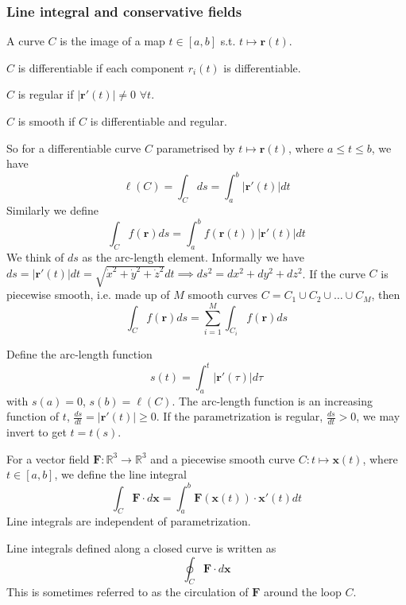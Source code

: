 \documentclass[a4paper]{article}
\begin{document}
\subsubsection*{Line integral and conservative fields}
\begin{defi}[Curve]
A curve $C$ is the image of a map $t\in[a,b]$ s.t. $t\mapsto\mathbf{r}(t)$.
\end{defi}
\begin{defi}
$C$ is differentiable if each component $r_i(t)$ is differentiable.
\end{defi}
\begin{defi}
$C$ is regular if $|\mathbf{r'}(t)|\neq 0$ $\forall t$.
\end{defi}
\begin{defi}
$C$ is smooth if $C$ is differentiable and regular.
\end{defi}
\begin{remarks}
So for a differentiable curve $C$ parametrised by $t\mapsto\mathbf{r}(t)$, where $a\leq t\leq b$, we have
$$\ell(C)=\int_Cds=\int_a^b|\mathbf{r'}(t)|dt$$
Similarly we define
$$\int_Cf(\mathbf{r})ds=\int_a^bf(\mathbf{r}(t))|\mathbf{r'}(t)|dt$$
We think of $ds$ as the arc-length element. Informally we have $ds=|\mathbf{r'}(t)|dt=\sqrt{\dot{x}^2+\dot{y}^2+\dot{z}^2}dt\implies ds^2=dx^2+dy^2+dz^2$. 
If the curve $C$ is piecewise smooth, i.e. made up of $M$ smooth curves $C=C_1\cup C_2\cup\dots\cup C_M$, then
$$\int_Cf(\mathbf{r})ds=\sum_{i=1}^M\int_{C_i}f(\mathbf{r})ds$$
\end{remarks}
\begin{defi}
Define the arc-length function 
$$s(t)=\int_a^t|\mathbf{r'}(\tau)|d\tau$$
with $s(a)=0$, $s(b)=\ell(C)$.  The arc-length function is an
increasing function of $t$,  $\frac{ds}{dt}=|\mathbf{r'}(t)|\geq0$. If the parametrization is regular, $\frac{ds}{dt}>0$, we may invert to get $t=t(s)$.
\end{defi}
\begin{defi}
For a vector field $\mathbf{F}:\mathbb{R}^3\rightarrow\mathbb{R}^3$ and a piecewise smooth curve $C:t\mapsto\mathbf{x}(t)$, where $t\in[a,b]$, we define the line integral
\begin{equation}
    \int_C\mathbf{F}\cdot d\mathbf{x}=\int_a^b\mathbf{F}(\mathbf{x}(t))\cdot\mathbf{x'}(t)dt\tag{1.3}
\end{equation}
Line integrals are independent of parametrization.
\end{defi}
\begin{defi}[Circulation]
Line integrals defined along a closed curve is written as
$$\oint_C\mathbf{F}\cdot d\mathbf{x}$$
This is sometimes referred to as the circulation of $\mathbf{F}$ around the loop $C$.
\end{defi}
\end{document}
